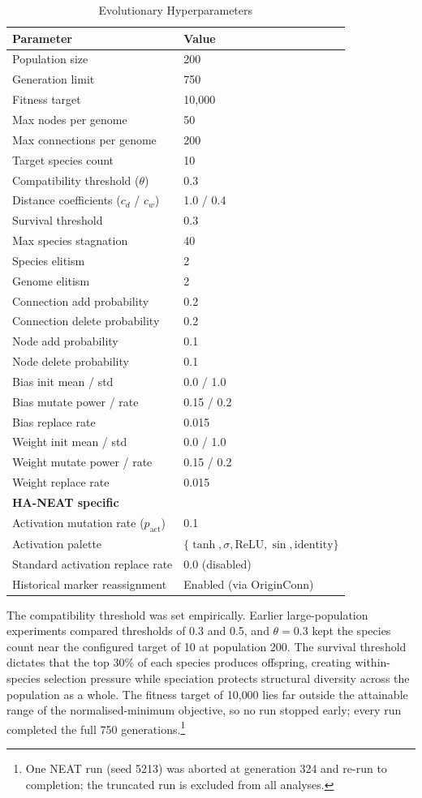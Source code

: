 \documentclass[12pt]{article}
\begin{document}
\begin{table}[h]
\centering
\caption{Evolutionary Hyperparameters}
\label{tab:hyperparameters}
\begin{tabular}{ll}
\toprule
\textbf{Parameter} & \textbf{Value} \\
\midrule
Population size & 200 \\
Generation limit & 750 \\
Fitness target & 10{,}000 \\
Max nodes per genome & 50 \\
Max connections per genome & 200 \\
Target species count & 10 \\
Compatibility threshold ($\theta$) & 0.3 \\
Distance coefficients ($c_d$ / $c_w$) & 1.0 / 0.4 \\
Survival threshold & 0.3 \\
Max species stagnation & 40 \\
Species elitism & 2 \\
Genome elitism & 2 \\
Connection add probability & 0.2 \\
Connection delete probability & 0.2 \\
Node add probability & 0.1 \\
Node delete probability & 0.1 \\
Bias init mean / std & 0.0 / 1.0 \\
Bias mutate power / rate & 0.15 / 0.2 \\
Bias replace rate & 0.015 \\
Weight init mean / std & 0.0 / 1.0 \\
Weight mutate power / rate & 0.15 / 0.2 \\
Weight replace rate & 0.015 \\
\midrule
\textbf{HA-NEAT specific} & \\
Activation mutation rate ($p_{\text{act}}$) & 0.1 \\
Activation palette & $\{\tanh, \sigma, \text{ReLU}, \sin, \text{identity}\}$ \\
Standard activation replace rate & 0.0 (disabled) \\
Historical marker reassignment & Enabled (via OriginConn) \\
\bottomrule
\end{tabular}
\end{table}

The compatibility threshold was set empirically.
Earlier large-population experiments compared thresholds of 0.3 and 0.5, and $\theta = 0.3$ kept the species count near the configured target of 10 at population 200.
The survival threshold dictates that the top 30\% of each species produces offspring, creating within-species selection pressure while speciation protects structural diversity across the population as a whole.
The fitness target of 10{,}000 lies far outside the attainable range of the normalised-minimum objective, so no run stopped early; every run completed the full 750 generations.\footnote{One NEAT run (seed 5213) was aborted at generation 324 and re-run to completion; the truncated run is excluded from all analyses.}
\end{document}
